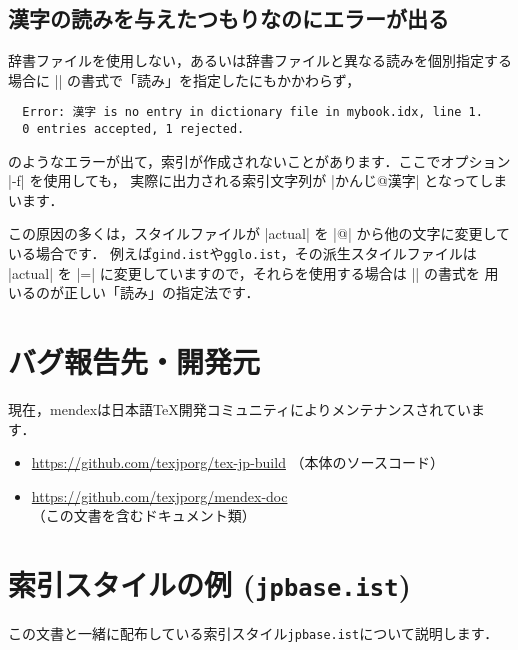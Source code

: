 \documentclass[a4paper]{jsarticle}
\newcommand{\SoftName}[1]{\textsf{#1}}
\newcommand{\FileName}[1]{\texttt{#1}}
\begin{document}
\subsection{漢字の読みを与えたつもりなのにエラーが出る}
辞書ファイルを使用しない，あるいは辞書ファイルと異なる読みを個別指定する場合に
|| の書式で「読み」を指定したにもかかわらず，
\begin{verbatim}
  Error: 漢字 is no entry in dictionary file in mybook.idx, line 1.
  0 entries accepted, 1 rejected.
\end{verbatim}
のようなエラーが出て，索引が作成されないことがあります．ここでオプション |-f| を使用しても，
実際に出力される索引文字列が |かんじ@漢字| となってしまいます．

この原因の多くは，スタイルファイルが |actual| を |@| から他の文字に変更している場合です．
例えば\FileName{gind.ist}や\FileName{gglo.ist}，その派生スタイルファイルは
|actual| を |=| に変更していますので，それらを使用する場合は || の書式を
用いるのが正しい「読み」の指定法です．

\section{バグ報告先・開発元}
現在，\SoftName{mendex}は日本語\TeX 開発コミュニティによりメンテナンスされています．
\begin{itemize}
  \item \url{https://github.com/texjporg/tex-jp-build} （本体のソースコード）
  \item \url{https://github.com/texjporg/mendex-doc} （この文書を含むドキュメント類）
\end{itemize}

\clearpage
\appendix

\section{索引スタイルの例 (\FileName{jpbase.ist})}
この文書と一緒に配布している索引スタイル\FileName{jpbase.ist}について説明します．
\end{document}
